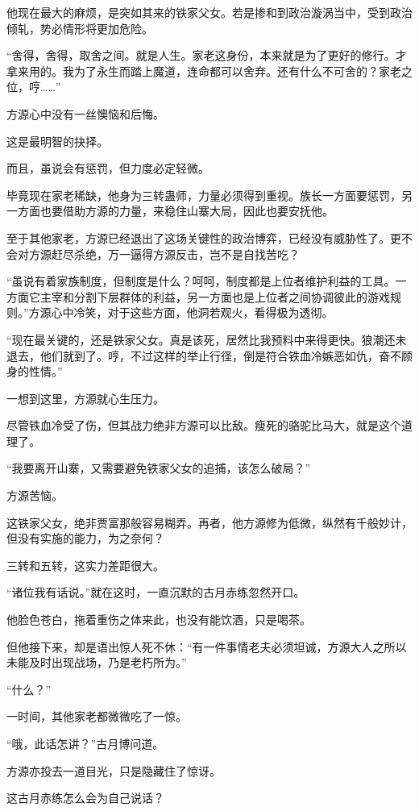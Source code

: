 \begin{this_body}
他现在最大的麻烦，是突如其来的铁家父女。若是掺和到政治漩涡当中，受到政治倾轧，势必情形将更加危险。

“舍得，舍得，取舍之间。就是人生。家老这身份，本来就是为了更好的修行。才拿来用的。我为了永生而踏上魔道，连命都可以舍弃。还有什么不可舍的？家老之位，哼……”

方源心中没有一丝懊恼和后悔。

这是最明智的抉择。

而且，虽说会有惩罚，但力度必定轻微。

毕竟现在家老稀缺，他身为三转蛊师，力量必须得到重视。族长一方面要惩罚，另一方面也要借助方源的力量，来稳住山寨大局，因此也要安抚他。

至于其他家老，方源已经退出了这场关键性的政治博弈，已经没有威胁性了。更不会对方源赶尽杀绝，万一逼得方源反击，岂不是自找苦吃？

“虽说有着家族制度，但制度是什么？呵呵，制度都是上位者维护利益的工具。一方面它主宰和分割下层群体的利益，另一方面也是上位者之间协调彼此的游戏规则。”方源心中冷笑，对于这些方面，他洞若观火，看得极为透彻。

“现在最关键的，还是铁家父女。真是该死，居然比我预料中来得更快。狼潮还未退去，他们就到了。哼，不过这样的举止行径，倒是符合铁血冷嫉恶如仇，奋不顾身的性情。”

一想到这里，方源就心生压力。

尽管铁血冷受了伤，但其战力绝非方源可以比敌。瘦死的骆驼比马大，就是这个道理了。

“我要离开山寨，又需要避免铁家父女的追捕，该怎么破局？”

方源苦恼。

这铁家父女，绝非贾富那般容易糊弄。再者，他方源修为低微，纵然有千般妙计，但没有实施的能力，为之奈何？

三转和五转，这实力差距很大。

“诸位我有话说。”就在这时，一直沉默的古月赤练忽然开口。

他脸色苍白，拖着重伤之体来此，也没有能饮酒，只是喝茶。

但他接下来，却是语出惊人死不休：“有一件事情老夫必须坦诚，方源大人之所以未能及时出现战场，乃是老朽所为。”

“什么？”

一时间，其他家老都微微吃了一惊。

“哦，此话怎讲？”古月博问道。

方源亦投去一道目光，只是隐藏住了惊讶。

这古月赤练怎么会为自己说话？


\end{this_body}
